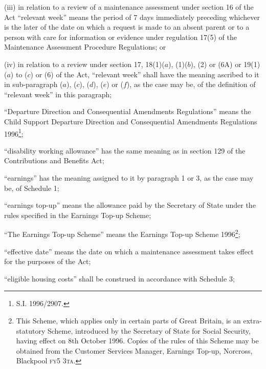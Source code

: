 \documentclass[12pt,a4paper]{article}
\begin{document}
\begin{enumerate}
\begin{enumerate}
(iii) in relation to a review of a maintenance assessment under section 16 of the Act “relevant week” means the period of 7 days immediately preceding whichever is the later of the date on which a request is made to an absent parent or to a person with care for information or evidence under regulation 17(5) of the Maintenance Assessment Procedure Regulations; or

(iv) in relation to a review under section 17, 18(1)($a$), (1)($b$), (2) or (6A) or 19(1)($a$) to ($c$) or (6) of the Act, “relevant week” shall have the meaning ascribed to it in sub-paragraph ($a$), ($c$), ($d$), ($e$) or ($f$), as the case may be, of the definition of “relevant week” in this paragraph;
\end{enumerate}

\begin{sloppypar}
“Departure Direction and Consequential Amendments Regulations” means the Child
Support Departure Direction and Consequential Amendments Regulations 1996\footnote{\frenchspacing S.I. 1996/2907.};
\end{sloppypar}

“disability working allowance” has the same meaning as in section 129 of the Contributions and Benefits Act;

“earnings” has the meaning assigned to it by paragraph 1 or 3, as the case may be, of Schedule 1;

“earnings top-up” means the allowance paid by the Secretary of State under the rules specified in the Earnings Top-up Scheme;

“The Earnings Top-up Scheme” means the Earnings Top-up Scheme 1996\footnote{\frenchspacing This Scheme, which applies only in certain parts of Great Britain, is an extra-statutory Scheme, introduced by the Secretary of State for Social Security, having effect on 8th October 1996. Copies of the rules of this Scheme may be obtained from the Customer Services Manager, Earnings Top-up, Norcross, Blackpool \textsc{fy5 3ta}.};

“effective date” means the date on which a maintenance assessment takes effect for the purposes of the Act;

“eligible housing costs” shall be construed in accordance with Schedule 3;


\end{enumerate}
\end{document}
